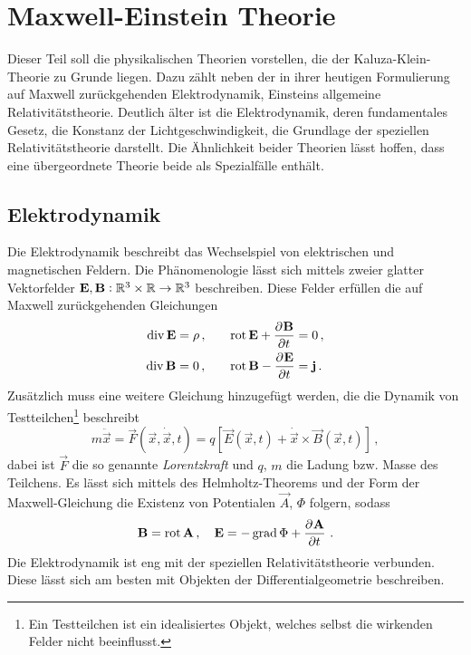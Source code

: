 \chapter{Maxwell-Einstein Theorie}
Dieser Teil soll die physikalischen Theorien vorstellen, die der
Kaluza-Klein-Theorie zu Grunde liegen. Dazu zählt neben der 
in ihrer heutigen Formulierung auf Maxwell zurückgehenden 
Elektrodynamik, Einsteins allgemeine Relativitätstheorie. 
Deutlich älter ist die Elektrodynamik, deren fundamentales Gesetz, die Konstanz
der Lichtgeschwindigkeit, die Grundlage der speziellen Relativitätstheorie
darstellt.
Die Ähnlichkeit beider Theorien lässt hoffen, dass eine 
übergeordnete Theorie beide als Spezialfälle enthält. 
\section{Elektrodynamik}
Die Elektrodynamik beschreibt das Wechselspiel von elektrischen und 
magnetischen Feldern. Die Phänomenologie lässt sich mittels zweier glatter Vektorfelder
$\mathbf{E},\mathbf{B}:\mathbb{R}^3\times\mathbb{R}\to \mathbb{R}^3$ beschreiben.
Diese Felder erfüllen die auf Maxwell zurückgehenden Gleichungen 
\begin{equation}
  \begin{alignedat}{2}
    \Div\vec{E} &= \rho\,,  & \qquad \Rot\vec{E}+\dpd{\vec{B}}{t}&
    =0\,,\\
    \Div\vec{B} &= 0\,,& \qquad\Rot\vec{B}-\dpd{\vec{E}}{t}&
    =\vec{j}\,.
  \end{alignedat}
\end{equation}
Zusätzlich muss eine weitere Gleichung hinzugefügt werden, die die Dynamik von
Testteilchen\footnote{Ein Testteilchen ist ein idealisiertes Objekt, welches
selbst die wirkenden Felder nicht beeinflusst.} beschreibt
\begin{equation}
m\ddot{\vec{x}}=\vec{F}(\vec{x},\dot{\vec{x}},t)
=q\left[\vec{E}(\vec{x},t)+\dot{\vec{x}}\times\vec{B}(\vec{x},t)\right]\,,
\end{equation}
dabei ist $\vec{F}$ die so genannte \emph{Lorentzkraft} und $q$, $m$ die
Ladung bzw. Masse des Teilchens.
Es lässt sich mittels des Helmholtz-Theorems und der Form der Maxwell-Gleichung
die Existenz von Potentialen $\vec{A}$, $\Phi$ folgern, sodass
\begin{equation}
\vec{B}=\Rot \vec{A}\,,\quad \vec{E}=-\Grad\Phi+\dpd{\vec{A}}{t}\,.
\end{equation}
Die Elektrodynamik ist eng mit der speziellen Relativitätstheorie verbunden.
Diese lässt sich am besten mit Objekten der Differentialgeometrie beschreiben.
